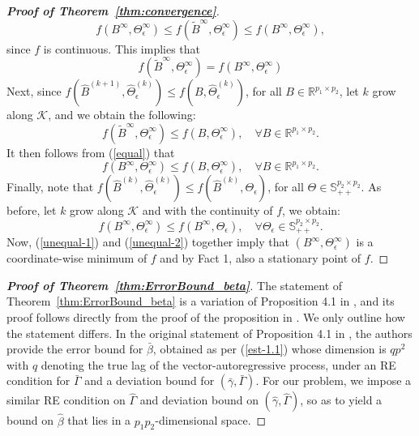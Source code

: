 \begin{proof}[\textbf{Proof of Theorem~\ref{thm:convergence}}]
	\begin{equation*}
	f(B^\infty,\Theta_\epsilon^\infty)\leq f(\widetilde{B}^\infty,\Theta_\epsilon^\infty)\leq f(B^\infty,\Theta_\epsilon^\infty),
	\end{equation*}
	since $f$ is continuous. This implies that 
	\begin{equation} \label{equal}
	f(\widetilde{B}^\infty,\Theta_\epsilon^\infty) = f(B^\infty,\Theta_\epsilon^\infty)
	\end{equation}
	Next, since $f(\widehat{B}^{(k+1)},\widehat{\Theta}_\epsilon^{(k)})\leq f(B,\widehat{\Theta}_\epsilon^{(k)})$, for all $B\in \mathbb{R}^{p_1\times p_2}$, let $k$ grow along $\mathcal{K}$, and we obtain the following:
	\begin{equation*}
	f(\widetilde{B}^\infty,\Theta_\epsilon^\infty)\leq f(B,\Theta_\epsilon^\infty),\quad \forall B\in \mathbb{R}^{p_1\times p_2}.
	\end{equation*}
	It then follows from (\ref{equal}) that 
	\begin{equation}\label{unequal-1}
	f(B^\infty,\Theta_\epsilon^\infty)\leq f(B,\Theta_\epsilon^\infty), \quad \forall B\in\mathbb{R}^{p_1\times p_2}.
	\end{equation}
	Finally, note that $f(\widehat{B}^{(k)},\widehat{\Theta}_\epsilon^{(k)})\leq f(\widehat{B}^{(k)},\Theta_\epsilon)$, for all $\Theta\in\mathbb{S}^{p_2\times p_2}_{++}$. As before, let $k$ grow along $\mathcal{K}$ and with the continuity of $f$, we obtain:
	\begin{equation}\label{unequal-2}
	f(B^\infty,\Theta_\epsilon^\infty) \leq f(B^\infty,\Theta_\epsilon), \quad \forall \Theta_\epsilon\in\mathbb{S}_{++}^{p_2\times p_2}. 
	\end{equation}
	Now, (\ref{unequal-1}) and (\ref{unequal-2}) together imply that $(B^\infty,\Theta_\epsilon^\infty)$ is a coordinate-wise minimum of $f$ and by Fact 1, 
	also a stationary point of $f$. 
\end{proof}

\medskip
\begin{proof}[\textbf{Proof of Theorem~\ref{thm:ErrorBound_beta}}]
	The statement of  Theorem~\ref{thm:ErrorBound_beta} is a variation of Proposition 4.1 in \citet{basu2015estimation}, and its proof follows directly from the proof of the
	proposition in \citet[Appendix B]{basu2015estimation}. We only outline how the statement differs. In the original statement of Proposition 4.1 in \citet{basu2015estimation}, the authors provide the error bound for $\bar{\beta}$, obtained as per (\ref{est-1.1}) whose dimension is $qp^2$ with $q$ denoting the true lag of the vector-autoregressive process, under an RE condition for $\bar{\Gamma}$ and a deviation bound for $(\bar{\gamma},\bar{\Gamma})$. For our problem, we impose a similar RE condition on $\widehat{\Gamma}$ and deviation bound on $(\widehat{\gamma},\widehat{\Gamma})$, so as to yield a bound on $\widehat{\beta}$ that lies in a $p_1p_2$-dimensional space. 
\end{proof}
\medskip

